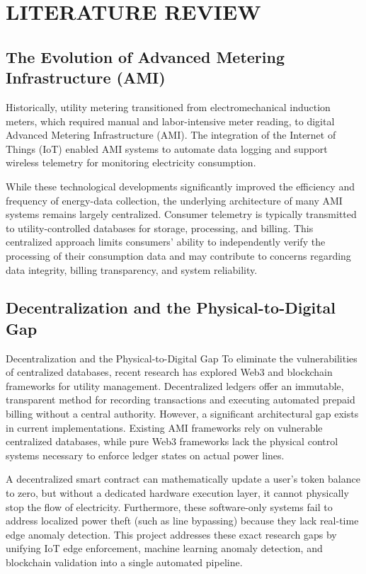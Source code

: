 \chapter{LITERATURE REVIEW}

\section{The Evolution of Advanced Metering Infrastructure (AMI)}

Historically, utility metering transitioned from electromechanical induction meters, which required manual and labor-intensive meter reading, to digital Advanced Metering Infrastructure (AMI). The integration of the Internet of Things (IoT) enabled AMI systems to automate data logging and support wireless telemetry for monitoring electricity consumption.

While these technological developments significantly improved the efficiency and frequency of energy-data collection, the underlying architecture of many AMI systems remains largely centralized. Consumer telemetry is typically transmitted to utility-controlled databases for storage, processing, and billing. This centralized approach limits consumers' ability to independently verify the processing of their consumption data and may contribute to concerns regarding data integrity, billing transparency, and system reliability.

\section{Decentralization and the Physical-to-Digital Gap}
Decentralization and the Physical-to-Digital Gap
To eliminate the vulnerabilities of centralized databases, recent research has explored Web3 and blockchain frameworks for utility management. Decentralized ledgers offer an immutable, transparent method for recording transactions and executing automated prepaid billing without a central authority. However, a significant architectural gap exists in current implementations. Existing AMI frameworks rely on vulnerable centralized databases, while pure Web3 frameworks lack the physical control systems necessary to enforce ledger states on actual power lines.

A decentralized smart contract can mathematically update a user's token balance to zero, but without a dedicated hardware execution layer, it cannot physically stop the flow of electricity. Furthermore, these software-only systems fail to address localized power theft (such as line bypassing) because they lack real-time edge anomaly detection. This project addresses these exact research gaps by unifying IoT edge enforcement, machine learning anomaly detection, and blockchain validation into a single automated pipeline.